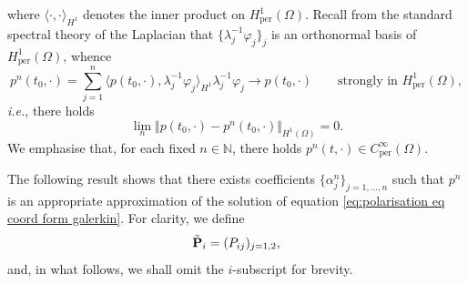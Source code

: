 \documentclass[11pt,a4paper,reqno]{amsart}
\theoremstyle{remark}
\theoremstyle{definition}
\numberwithin{equation}{section}
\newcommand{\per}{\mathrm{per}}
\renewcommand{\P}{{\bf P}}
\begin{document}
where $\langle \cdot, \cdot \rangle_{H^1}$ denotes the inner product on $H^1_\per(\Omega)$. Recall from the standard spectral theory of the Laplacian that $\{ \lambda_j^{-1}\varphi_j \}_j$ is an orthonormal basis of $H^1_\per(\Omega)$, whence 
\begin{equation*}
    p^n(t_0,\cdot) = \sum_{j=1}^n \langle p(t_0,\cdot) , \lambda_j^{-1} \varphi_j \rangle_{H^1} \lambda_j^{-1}\varphi_j \longrightarrow p(t_0,\cdot) \qquad \text{strongly in } H^1_\per(\Omega), 
\end{equation*}
\textit{i.e.}, there holds 
\begin{equation}\label{eq:conv of initial data for galerkin}
    \lim_n \Vert p(t_0,\cdot) - p^n(t_0,\cdot) \Vert_{H^1(\Omega)} = 0. 
\end{equation}
We emphasise that, for each fixed $n\in\mathbb{N}$, there holds $p^n(t,\cdot) \in C^\infty_\per(\Omega). $





The following result shows that there exists coefficients $\{\alpha^n_j\}_{j=1,\dots,n}$ such that $p^n$ is an appropriate approximation of the solution of equation \eqref{eq:polarisation eq coord form galerkin}. For clarity, we define 
\begin{equation}\label{eq:tilde P def}
\tilde{\P}_i = (P_{ij})_{j=1,2}, 
\end{equation}
and, in what follows, we shall omit the $i$-subscript for brevity. 
\end{document}
